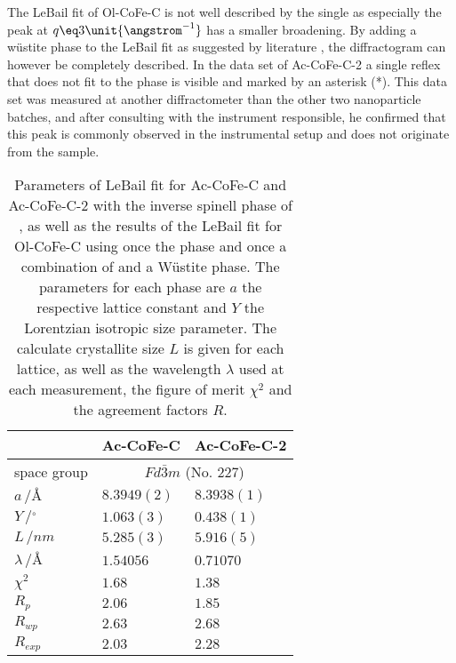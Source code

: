 \documentclass[\main/dresen_thesis.tex]{subfiles}
\begin{document}
  The LeBail fit of Ol-CoFe-C is not well described by the single  as especially the peak at $q \eq 3 \unit{\angstrom^{-1}}$ has a smaller broadening.
  By adding a w\"ustite phase to the LeBail fit as suggested by literature \cite{Bodnarchuk_2009_Excha}, the diffractogram can however be completely described.
  In the data set of Ac-CoFe-C-2 a single reflex that does not fit to the phase is visible and marked by an asterisk (*).
  This data set was measured at another diffractometer than the other two nanoparticle batches, and after consulting with the instrument responsible, he confirmed that this peak is commonly observed in the instrumental setup and does not originate from the sample.
  \begin{table}[ht]
    \centering
    \caption{\label{tab:monolayers:nanoparticle:discussion:xrdLeBail}Parameters of LeBail fit for Ac-CoFe-C and Ac-CoFe-C-2 with the inverse spinell phase of , as well as the results of the LeBail fit for Ol-CoFe-C using once the  phase and once a combination of  and a W\"ustite phase. The parameters for each phase are $a$ the respective lattice constant and $Y$ the Lorentzian isotropic size parameter. The calculate crystallite size $L$ is given for each lattice, as well as the wavelength $\lambda$ used at each measurement, the figure of merit $\chi^2$ and the agreement factors $R$.}
    \begin{tabular}{ l | l | l }
      \hline
      \rule{0pt}{2ex} & \textbf{Ac-CoFe-C} & \textbf{Ac-CoFe-C-2} \\
      \hline
      \rule{0pt}{2ex}space group & \multicolumn{2}{c}{$Fd\bar{3}m$ (No. 227)}\\
      \hline
      \rule{0pt}{2ex} $a \,/ \unit{\angstrom}$        & $8.3949(2)$ & $8.3938(1)$\\
      \rule{0pt}{2ex} $Y \,/ \unit{^\circ}$           & $1.063(3)$  & $0.438(1)$ \\
      \hline
      \rule{0pt}{2ex} $L \,/ \unit{nm}$               & $5.285(3)$  & $5.916(5)$ \\
      \hline
      \rule{0pt}{2ex} $\lambda \,/ \unit{\angstrom}$  & $1.54056$   & $0.71070$ \\
      \hline
      \rule{0pt}{2ex} $\chi^2$  & $1.68$ & $1.38$ \\
      \rule{0pt}{2ex} $R_p$     & $2.06$ & $1.85$ \\
      \rule{0pt}{2ex} $R_{wp}$  & $2.63$ & $2.68$ \\
      \rule{0pt}{2ex} $R_{exp}$ & $2.03$ & $2.28$ \\

\end{tabular}
\end{table}
\end{document}
